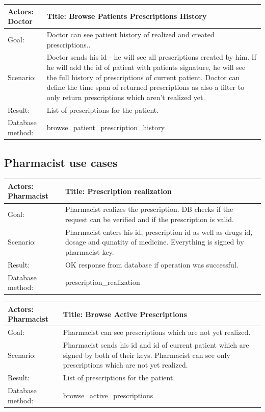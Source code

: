 \begin{table}[h]
    \begin{tabular}{| p{6cm} | p{7.75cm} |}
    \hline
    Actors: Doctor &Title: Browse Patients Prescriptions History \\ \hline
    Goal: & Doctor can see patient history of realized and created prescriptions..\\ \hline
    Scenario: & Doctor sends his id - he will see all prescriptions created by him. If he will add the id of patient with patients signature, he will see the full history of prescriptions of current patient. Doctor can define the time span of returned prescriptions as also a filter to only return prescriptions which aren't realized yet. \\ \hline
    Result: & List of prescriptions for the patient. \\ \hline
    Database  method: & browse\_patient\_prescription\_history \\ \hline
    \end{tabular}
\end{table}

\subsection{Pharmacist use cases}

\begin{table}[h]
    \begin{tabular}{| p{6cm} | p{7.75cm} |}
    \hline
    Actors: Pharmacist &Title: Prescription realization\\ \hline
    Goal: & Pharmacist realizes the prescription. DB checks if the request can be verified and if the prescription is valid.\\ \hline
    Scenario: & Pharmacist enters his id, prescription id as well as drugs id, dosage and qunatity of medicine. Everything is signed by pharmacist key. \\ \hline
    Result: & OK response from database if operation was successful. \\ \hline
    Database  method: & prescription\_realization \\ \hline
    \end{tabular}
\end{table}

\begin{table}[h]
    \begin{tabular}{| p{6cm} | p{7.75cm} |}
    \hline
    Actors: Pharmacist &Title: Browse Active Prescriptions \\ \hline
    Goal: & Pharmacist can see prescriptions which are not yet realized. \\ \hline
    Scenario: & Pharmacist sends his id and id of current patient which are signed by both of their keys. Pharmacist can see only prescriptions which are not yet realized. \\ \hline
    Result: & List of prescriptions for the patient. \\ \hline
    Database  method: & browse\_active\_prescriptions \\ \hline
    \end{tabular}
\end{table}

